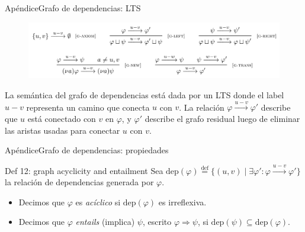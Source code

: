 \documentclass{beamer}
\begin{document}
\begin{frame}{Apéndice}{Grafo de dependencias: LTS}
    \begin{figure}[H]
        \includegraphics[width=\textwidth]{dependency-graph-lts}
    \end{figure}

    La semántica del grafo de dependencias está dada por un LTS donde el label $u - v$ representa un camino que conecta $u$ con $v$. La relación $\varphi \xrightarrow{u-v} \varphi'$ describe que $u$ está conectado con $v$ en $\varphi$, y $\varphi'$ describe el grafo residual luego de eliminar las aristas usadas para conectar $u$ con $v$.
\end{frame}

\begin{frame}{Apéndice}{Grafo de dependencias: propiedades}
    \begin{block}{Def 12: graph acyclicity and entailment}
        Sea $\text{dep}(\varphi) \stackrel{\text{def}}{=} \{ (u,v) \mid \exists \varphi' : \varphi \xrightarrow{u-v} \varphi' \}$ la relación de dependencias generada por $\varphi$.
        \begin{itemize}
            \item Decimos que $\varphi$ es \emph{acíclico} si $\text{dep}(\varphi)$ es irreflexiva.
            \item Decimos que $\varphi$ \emph{entails} (implica) $\psi$, escrito $\varphi \Rightarrow \psi$, si $\text{dep}(\psi) \subseteq \text{dep}(\varphi)$.
        \end{itemize}
    \end{block}
\end{frame}
\end{document}
